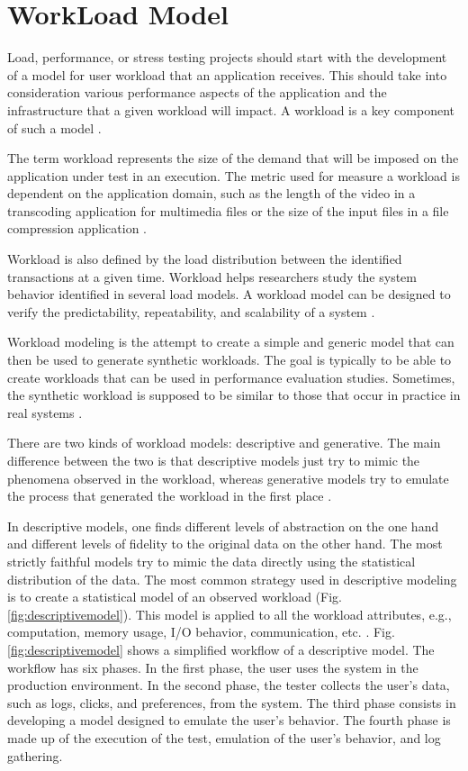 \documentclass[review]{elsarticle}
\begin{document}
\section{WorkLoad Model}

Load, performance, or stress testing projects should start with the development of a model for user workload that an application receives. This should take into consideration various performance aspects of the application and the infrastructure that a given workload will impact. A workload is a key component of such a model \cite{Molyneaux2009}.

The term workload represents the size of the demand that will be imposed on the application under test in an execution. The metric  used for measure a workload is dependent on the application domain, such as the length of the video in a transcoding application for multimedia files or the size of the input files in a file compression application \cite{Feitelson2013} \cite{Molyneaux2009} \cite{Goncalves2014}. 

Workload is also defined by the load distribution between the identified transactions at a given time. Workload helps researchers study the system behavior identified in several load models. A workload model can be designed to verify the predictability, repeatability, and scalability of a system \cite{Feitelson2013} \cite{Molyneaux2009}.


Workload modeling is the attempt to create a simple and generic model that can then be used to generate synthetic workloads. The goal is typically to be able to create workloads that can be used in performance evaluation studies. Sometimes, the synthetic workload is supposed to be similar to those that occur in practice in real systems \cite{Feitelson2013} \cite{Molyneaux2009}.

There are two kinds of workload models: descriptive and generative. The main difference between the two is that descriptive models just try to mimic the phenomena observed in the workload, whereas generative models try to emulate the process that generated the workload in the first place \cite{DiLucca2006}. 

In descriptive models, one finds different levels of abstraction on the one hand and different levels of fidelity to the original data on the other hand. The most strictly faithful models try to mimic the data directly using the statistical distribution of the data. The most common strategy used in descriptive modeling is to create a statistical model of an observed workload (Fig. \ref{fig:descriptivemodel}). This model is applied to all the workload attributes, e.g., computation, memory usage, I/O behavior, communication, etc. \cite{DiLucca2006}. Fig. \ref{fig:descriptivemodel} shows a simplified workflow of a descriptive model. The workflow has six phases. In the first phase, the user uses the system in the production environment. In the second phase, the tester collects the user's data, such as logs, clicks, and preferences, from the system. The third phase consists in developing a model designed to emulate the user's behavior. The fourth phase is made up of the execution of the test, emulation of the user's behavior, and log gathering.
\end{document}
